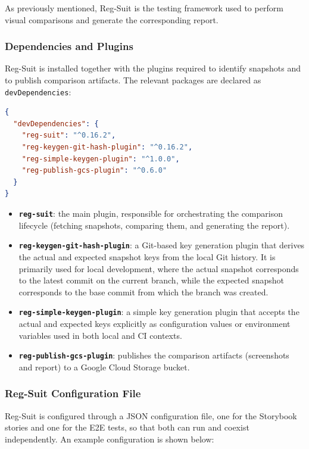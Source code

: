 As previously mentioned, Reg-Suit is the testing framework used to perform visual comparisons and generate the corresponding report.

\subsubsection{Dependencies and Plugins}

Reg-Suit is installed together with the plugins required to identify snapshots and to publish comparison artifacts. The relevant packages are declared as \texttt{devDependencies}:

\begin{lstlisting}[language=json]
{
  "devDependencies": {
    "reg-suit": "^0.16.2",
    "reg-keygen-git-hash-plugin": "^0.16.2",
    "reg-simple-keygen-plugin": "^1.0.0",
    "reg-publish-gcs-plugin": "^0.6.0"
  }
}
\end{lstlisting}

\begin{itemize}
    \item \textbf{\texttt{reg-suit}}: the main plugin, responsible for orchestrating the comparison lifecycle (fetching snapshots, comparing them, and generating the report).
    \item \textbf{\texttt{reg-keygen-git-hash-plugin}}: a Git-based key generation plugin that derives the actual and expected snapshot keys from the local Git history. It is primarily used for local development, where the actual snapshot corresponds to the latest commit on the current branch, while the expected snapshot corresponds to the base commit from which the branch was created.
    \item \textbf{\texttt{reg-simple-keygen-plugin}}: a simple key generation plugin that accepts the actual and expected keys explicitly as configuration values or environment variables used in both local and \ac{CI} contexts.
    \item \textbf{\texttt{reg-publish-gcs-plugin}}: publishes the comparison artifacts (screenshots and report) to a Google Cloud Storage bucket.
\end{itemize}

\subsubsection{Reg-Suit Configuration File}

Reg-Suit is configured through a JSON configuration file, one for the Storybook stories and one for the \ac{E2E} tests, so that both can run and coexist independently. An example configuration is shown below:

